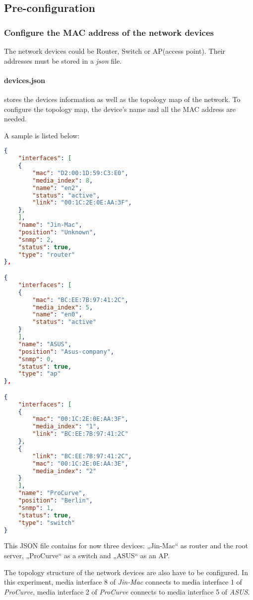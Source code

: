 \subsection{Pre-configuration}

\subsubsection{Configure the MAC address of the network devices}
The network devices could be Router, Switch or AP(access point). Their addresses must be stored in a \textit{json} file.

\paragraph{devices.json} stores the devices information as well as the topology map of the network. To configure the topology map, the device's name and all the MAC address are needed.

A sample is listed below:

\begin{lstlisting}[language=json,firstnumber=1,caption={Code segments of \textit{devices.json}}]
{
	"interfaces": [
	{
		"mac": "D2:00:1D:59:C3:E0",
		"media_index": 8,
		"name": "en2",
		"status": "active",	
		"link": "00:1C:2E:0E:AA:3F",
	},
	],
	"name": "Jin-Mac",
	"position": "Unknown",
	"snmp": 2,
	"status": true,
	"type": "router"
},

{
	"interfaces": [
	{
		"mac": "BC:EE:7B:97:41:2C",
		"media_index": 5,
		"name": "en0",
		"status": "active"
	}
	],
	"name": "ASUS",
	"position": "Asus-company",
	"snmp": 0,
	"status": true,
	"type": "ap"
},

{
	"interfaces": [
	{
		"mac": "00:1C:2E:0E:AA:3F",
		"media_index": "1",
		"link": "BC:EE:7B:97:41:2C"
	},
	{
		"link": "BC:EE:7B:97:41:2C",
		"mac": "00:1C:2E:0E:AA:3E",
		"media_index": "2"
	}
	],
	"name": "ProCurve",
	"position": "Berlin",
	"snmp": 1,
	"status": true,
	"type": "switch"
}
\end{lstlisting}

This JSON file contains for now three devices: „Jin-Mac“ as router and the root server, „ProCurve“ as a switch and „ASUS“ as an AP.

The topology structure of the network devices are also have to be configured.
In this experiment, media interface 8 of \textit{Jin-Mac} connects to media interface 1 of \textit{ProCurve}, media interface 2 of \textit{ProCurve} connects to media interface 5 of \textit{ASUS}.

